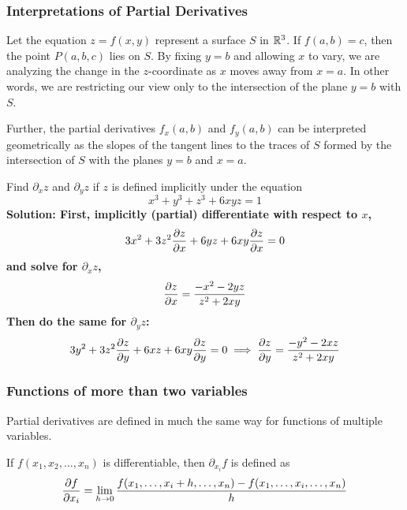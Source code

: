 \subsubsection{Interpretations of Partial Derivatives}
Let the equation \(z=f(x,y)\) represent a surface \(S\) in \(\mathbb{R}^3\). If \(f(a,b)=c\), then the point \(P(a,b,c)\) lies on \(S\). By fixing \(y=b\) and allowing \(x\) to vary, we are analyzing the change in the \(z\)-coordinate as \(x\) moves away from \(x=a\). In other words, we are restricting our view only to the intersection of the plane \(y=b\) with \(S\).\par
Further, the partial derivatives \(f_x(a,b)\) and \(f_y(a,b)\) can be interpreted geometrically as the slopes of the tangent lines to the traces of \(S\) formed by the intersection of \(S\) with the planes \(y=b\) and \(x=a\).
\begin{example}
    Find \(\partial_xz\) and \(\partial_yz\) if \(z\) is defined implicitly under the equation 
    \[ x^3+y^3+z^3+6xyz=1\]
    \bf{Solution: }First, implicitly (partial) differentiate with respect to \(x\),
    \[ 3x^2+3z^2\pdv{z}{x}+6yz+6xy\pdv{z}{x} = 0\]
    and solve for \(\partial_xz\),
    \[ \pdv{z}{x} = \frac{-x^2-2yz}{z^2+2xy}\]
    Then do the same for \(\partial_yz\):
    \[ 3y^2+3z^2\pdv{z}{y}+6xz+6xy\pdv{z}{y} = 0\implies \pdv{z}{y} = \frac{-y^2-2xz}{z^2+2xy}\]
\end{example}  
\subsubsection{Functions of more than two variables}
Partial derivatives are defined in much the same way for functions of multiple variables.
\begin{definition}
    If \(f(x_1, x_2, \dots, x_n)\) is differentiable, then \(\partial_{x_i}f\) is defined as
    \[ \pdv{f}{x_i} = \lim_{h\to 0}\frac{f(x_1, \dots, x_i + h, \dots, x_n) - f(x_1, \dots, x_i, \dots, x_n)}{h}\]
\end{definition}
